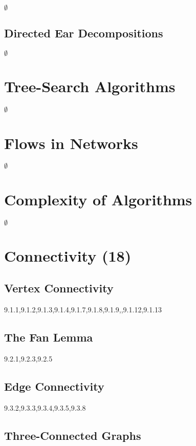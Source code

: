 \documentclass[12pt]{article}
\begin{document}
$\emptyset$

\subsection{Directed Ear Decompositions}

$\emptyset$

\newpage

\section{Tree-Search Algorithms}

$\emptyset$

\section{Flows in Networks}

$\emptyset$

\section{Complexity of Algorithms}

$\emptyset$

\newpage


\section{Connectivity (18)}

\subsection{Vertex Connectivity}

9.1.1,9.1.2,9.1.3,9.1.4,9.1.7,9.1.8,9.1.9,,9.1.12,9.1.13

\subsection{The Fan Lemma}

9.2.1,9.2.3,9.2.5

\subsection{Edge Connectivity}

9.3.2,9.3.3,9.3.4,9.3.5,9.3.8

\subsection{Three-Connected Graphs}
\end{document}
